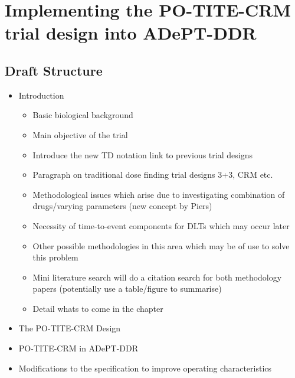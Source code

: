 
\chapter{Implementing the PO-TITE-CRM trial design into ADePT-DDR} %

\label{Chapter1} %

\section{Draft Structure}
\begin{itemize}
	\item Introduction 
		\begin{itemize}
			\item Basic biological background 
			\item Main objective of the trial 
			\item Introduce the new TD notation link to previous trial designs 
			\item Paragraph on traditional dose finding trial designs 3+3, CRM etc. 
			\item Methodological issues which arise due to investigating combination of drugs/varying parameters (new concept by Piers)
			\item Necessity of time-to-event components for DLTs which may occur later 
			\item Other possible methodologies in this area which may be of use to solve this problem
			\item Mini literature search will do a citation search for both methodology papers (potentially use a table/figure to summarise) 
			\item Detail whats to come in the chapter
		\end{itemize}
	\item The PO-TITE-CRM Design
	\item PO-TITE-CRM in ADePT-DDR 
	\item Modifications to the specification to improve operating characteristics 
	
\end{itemize}


